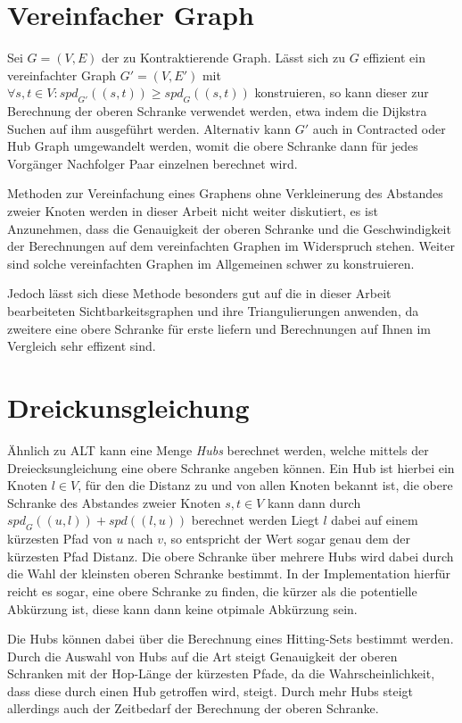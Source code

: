 \section{Vereinfacher Graph}
Sei $G = (V, E)$ der zu Kontraktierende Graph.
Lässt sich zu $G$ effizient ein vereinfachter Graph $G' = (V, E')$ mit $\forall s, t \in V \colon {spd}_{G'} ((s, t)) \geq {spd}_{G} ((s, t))$ konstruieren, so kann dieser zur Berechnung der oberen Schranke verwendet werden, etwa indem die Dijkstra Suchen auf ihm ausgeführt werden.
Alternativ kann $G'$ auch in Contracted oder Hub Graph umgewandelt werden, womit die obere Schranke dann für jedes Vorgänger Nachfolger Paar einzelnen berechnet wird.

Methoden zur Vereinfachung eines Graphens ohne Verkleinerung des Abstandes zweier Knoten werden in dieser Arbeit nicht weiter diskutiert, es ist Anzunehmen, dass die Genauigkeit der oberen Schranke und die Geschwindigkeit der Berechnungen auf dem vereinfachten Graphen im Widerspruch stehen.
Weiter sind solche vereinfachten Graphen im Allgemeinen schwer zu konstruieren.

Jedoch lässt sich diese Methode besonders gut auf die in dieser Arbeit bearbeiteten Sichtbarkeitsgraphen und ihre Triangulierungen anwenden, da zweitere eine obere Schranke für erste liefern und Berechnungen auf Ihnen im Vergleich sehr effizent sind.

\section{Dreickunsgleichung}
Ähnlich zu ALT\cite{goldberg2005computing} kann eine Menge \emph{Hubs} berechnet werden, welche mittels der Dreiecksungleichung eine obere Schranke angeben können.
Ein Hub ist hierbei ein Knoten $l \in V$, für den die Distanz zu und von allen Knoten bekannt ist, die obere Schranke des Abstandes zweier Knoten $s, t \in V$ kann dann durch ${spd}_G ((u, l)) + {spd}((l, u))$ berechnet werden
Liegt $l$ dabei auf einem kürzesten Pfad von $u$ nach $v$, so entspricht der Wert sogar genau dem der kürzesten Pfad Distanz.
Die obere Schranke über mehrere Hubs wird dabei durch die Wahl der kleinsten oberen Schranke bestimmt.
In der Implementation hierfür reicht es sogar, eine obere Schranke zu finden, die kürzer als die potentielle Abkürzung ist, diese kann dann keine otpimale Abkürzung sein.

Die Hubs können dabei über die Berechnung eines Hitting-Sets bestimmt werden.
Durch die Auswahl von Hubs auf die Art steigt Genauigkeit der oberen Schranken mit der Hop-Länge der kürzesten Pfade, da die Wahrscheinlichkeit, dass diese durch einen Hub getroffen wird, steigt.
Durch mehr Hubs steigt allerdings auch der Zeitbedarf der Berechnung der oberen Schranke.

